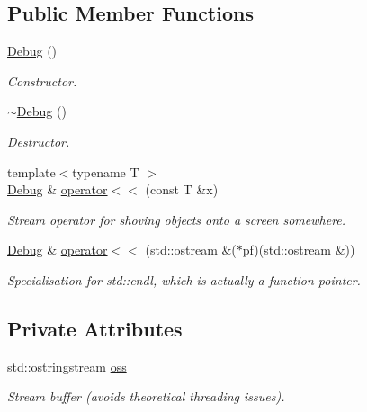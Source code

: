 \subsection*{Public Member Functions}
\begin{DoxyCompactItemize}
\item 
\hyperlink{classDebug_a5b453c195c4cfffed2702c3330f53a64}{Debug} ()
\begin{DoxyCompactList}\small\item\em Constructor. \end{DoxyCompactList}\item 
\hyperlink{classDebug_a911a84a0f56b770724e09a049399dc30}{$\sim$\+Debug} ()
\begin{DoxyCompactList}\small\item\em Destructor. \end{DoxyCompactList}\item 
{\footnotesize template$<$typename T $>$ }\\\hyperlink{classDebug}{Debug} \& \hyperlink{classDebug_a7fdf38b9c8d1976b5a723e4bf59fec49}{operator$<$$<$} (const T \&x)
\begin{DoxyCompactList}\small\item\em Stream operator for shoving objects onto a screen somewhere. \end{DoxyCompactList}\item 
\hyperlink{classDebug}{Debug} \& \hyperlink{classDebug_a5e12ec5223bcbbc2f7d6d72c72b37bd7}{operator$<$$<$} (std\+::ostream \&($\ast$pf)(std\+::ostream \&))
\begin{DoxyCompactList}\small\item\em Specialisation for std\+::endl, which is actually a function pointer. \end{DoxyCompactList}\end{DoxyCompactItemize}
\subsection*{Private Attributes}
\begin{DoxyCompactItemize}
\item 
std\+::ostringstream \hyperlink{classDebug_a45f5726114c0078b31b9a0f70199f51e}{oss}
\begin{DoxyCompactList}\small\item\em Stream buffer (avoids theoretical threading issues). \end{DoxyCompactList}\end{DoxyCompactItemize}



